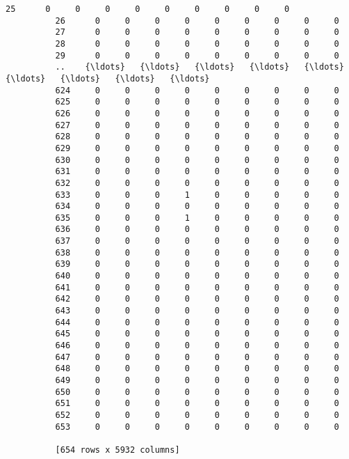 \documentclass[11pt]{article}
\begin{document}
\begin{Verbatim}[commandchars=\\\{\}]
          25      0     0     0     0     0     0     0     0     0  
          26      0     0     0     0     0     0     0     0     0  
          27      0     0     0     0     0     0     0     0     0  
          28      0     0     0     0     0     0     0     0     0  
          29      0     0     0     0     0     0     0     0     0  
          ..    {\ldots}   {\ldots}   {\ldots}   {\ldots}   {\ldots}   {\ldots}   {\ldots}   {\ldots}   {\ldots}  
          624     0     0     0     0     0     0     0     0     0  
          625     0     0     0     0     0     0     0     0     0  
          626     0     0     0     0     0     0     0     0     0  
          627     0     0     0     0     0     0     0     0     0  
          628     0     0     0     0     0     0     0     0     0  
          629     0     0     0     0     0     0     0     0     0  
          630     0     0     0     0     0     0     0     0     0  
          631     0     0     0     0     0     0     0     0     0  
          632     0     0     0     0     0     0     0     0     0  
          633     0     0     0     1     0     0     0     0     0  
          634     0     0     0     0     0     0     0     0     0  
          635     0     0     0     1     0     0     0     0     0  
          636     0     0     0     0     0     0     0     0     0  
          637     0     0     0     0     0     0     0     0     0  
          638     0     0     0     0     0     0     0     0     0  
          639     0     0     0     0     0     0     0     0     0  
          640     0     0     0     0     0     0     0     0     0  
          641     0     0     0     0     0     0     0     0     0  
          642     0     0     0     0     0     0     0     0     0  
          643     0     0     0     0     0     0     0     0     0  
          644     0     0     0     0     0     0     0     0     0  
          645     0     0     0     0     0     0     0     0     0  
          646     0     0     0     0     0     0     0     0     0  
          647     0     0     0     0     0     0     0     0     0  
          648     0     0     0     0     0     0     0     0     0  
          649     0     0     0     0     0     0     0     0     0  
          650     0     0     0     0     0     0     0     0     0  
          651     0     0     0     0     0     0     0     0     0  
          652     0     0     0     0     0     0     0     0     0  
          653     0     0     0     0     0     0     0     0     0  
          
          [654 rows x 5932 columns]
\end{Verbatim}
            
\end{document}
